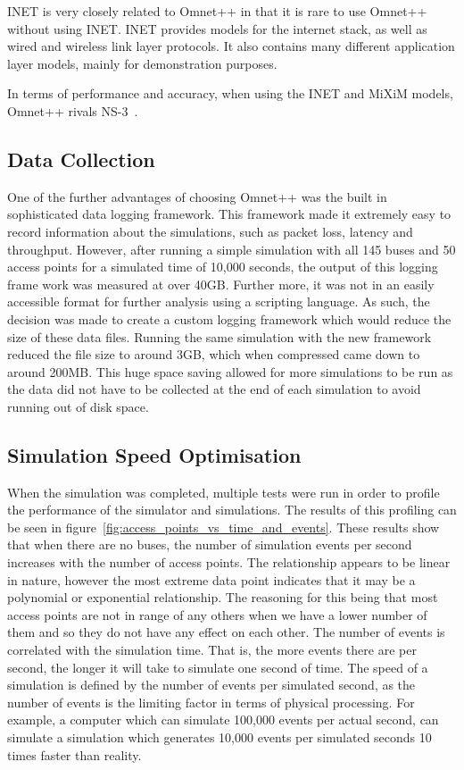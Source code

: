             INET is very closely related to Omnet++ in that it is rare to use Omnet++ without using INET. INET provides models for the internet stack, as well as wired and wireless link layer protocols. It also contains many different application layer models, mainly for demonstration purposes.  

            In terms of performance and accuracy, when using the INET and MiXiM models, Omnet++ rivals NS-3~\cite{networksimulatorcomparison}.


        \subsection{Data Collection}\label{simulation_simulator_options_data_collection}

            One of the further advantages of choosing Omnet++ was the built in sophisticated data logging framework. This framework made it extremely easy to record information about the simulations, such as packet loss, latency and throughput. However, after running a simple simulation with all 145 buses and 50 access points for a simulated time of 10,000 seconds, the output of this logging frame work was measured at over 40GB. Further more, it was not in an easily accessible format for further analysis using a scripting language. As such, the decision was made to create a custom logging framework which would reduce the size of these data files. Running the same simulation with the new framework reduced the file size to around 3GB, which when compressed came down to around 200MB. This huge space saving allowed for more simulations to be run as the data did not have to be collected at the end of each simulation to avoid running out of disk space. 

        \subsection{Simulation Speed Optimisation}\label{simulation_simulator_options_simulation_speed_optimisation}

            When the simulation was completed, multiple tests were run in order to profile the performance of the simulator and simulations. The results of this profiling can be seen in figure~\ref{fig:access_points_vs_time_and_events}. These results show that when there are no buses, the number of simulation events per second increases with the number of access points. The relationship appears to be linear in nature, however the most extreme data point indicates that it may be a polynomial or exponential relationship. The reasoning for this being that most access points are not in range of any others when we have a lower number of them and so they do not have any effect on each other. The number of events is correlated with the simulation time. That is, the more events there are per second, the longer it will take to simulate one second of time. The speed of a simulation is defined by the number of events per simulated second, as the number of events is the limiting factor in terms of physical processing. For example, a computer which can simulate 100,000 events per actual second, can simulate a simulation which generates 10,000 events per simulated seconds 10 times faster than reality. 

